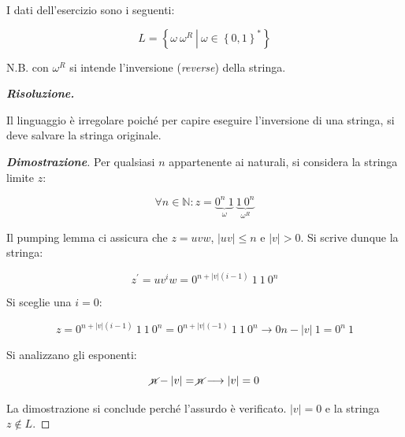 \documentclass[a4paper]{article}
\begin{document}
	\noindent
	I dati dell'esercizio sono i seguenti:
	
	\begin{equation*}
		L = \left\{\omega \: \omega^{R} \: \left| \: \omega \in \left\{0,1\right\}^{*} \right.\right\}
	\end{equation*}\newline

	\noindent
	N.B. con $\omega^{R}$ si intende l'inversione (\emph{reverse}) della stringa.\newline
	
	\noindent
	\textcolor{Green4}{\textbf{\emph{Risoluzione.}}}\newline
	
	\noindent
	Il linguaggio è irregolare poiché per capire eseguire l'inversione di una stringa, si deve salvare la stringa originale.
	
	\begin{proof}[\textcolor{Blue3}{\textbf{Dimostrazione}}]
		Per qualsiasi $n$ appartenente ai naturali, si considera la stringa limite $z$:
		
		\begin{equation*}
			\forall n \in \mathbb{N} : z = \underbrace{0^{n} \: 1}_{\omega} \: \underbrace{1 \: 0^{n}}_{\omega^{R}}
		\end{equation*}
	
		\noindent
		Il pumping lemma ci assicura che $z = uvw$, $|uv| \le n$ e $|v| > 0$. Si scrive dunque la stringa:
		
		\begin{equation*}
			z^{'} = uv^{i}w = 0^{n + |v|\left(i-1\right)} \: 1 \: 1 \: 0^{n}
		\end{equation*}
	
		\noindent
		Si sceglie una $i = 0$:
		
		\begin{equation*}
			z = 0^{n + |v|\left(i-1\right)} \: 1 \: 1 \: 0^{n} = 0^{n + |v|\left(-1\right)} \: 1 \: 1 \: 0^{n} \longrightarrow 0{n - |v|} \: 1 = 0^{n} \: 1
		\end{equation*}
	
		\noindent
		Si analizzano gli esponenti:
		
		\begin{equation*}
			\cancel{n} - |v| = \cancel{n} \longrightarrow |v| = 0
		\end{equation*}
	
		\noindent
		La dimostrazione si conclude perché l'assurdo è verificato. $|v| = 0$ e la stringa $z \notin L$.
	\end{proof}
\end{document}

